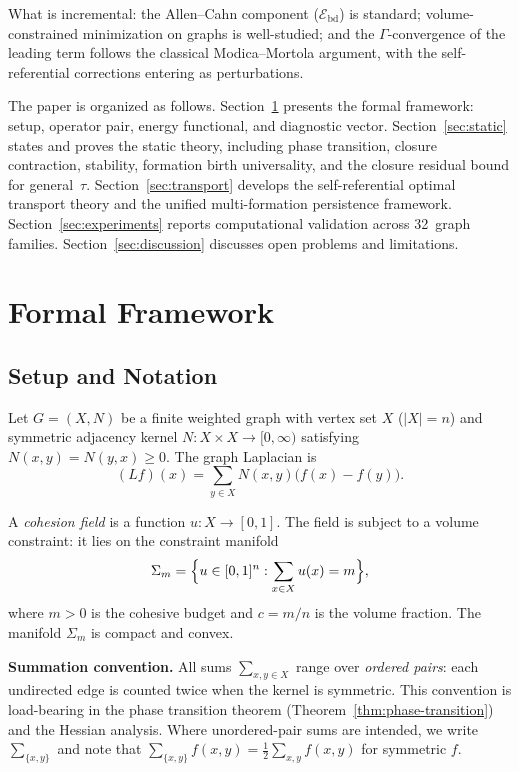 \documentclass[lettersize,journal]{IEEEtran}
\begin{document}
What is incremental: the Allen--Cahn component ($\mathcal{E}_{\mathrm{bd}}$) is standard; volume-constrained minimization on graphs is well-studied; and the $\Gamma$-convergence of the leading term follows the classical Modica--Mortola argument, with the self-referential corrections entering as perturbations.

The paper is organized as follows. Section~\ref{sec:framework} presents the formal framework: setup, operator pair, energy functional, and diagnostic vector. Section~\ref{sec:static} states and proves the static theory, including phase transition, closure contraction, stability, formation birth universality, and the closure residual bound for general~$\tau$. Section~\ref{sec:transport} develops the self-referential optimal transport theory and the unified multi-formation persistence framework. Section~\ref{sec:experiments} reports computational validation across 32~graph families. Section~\ref{sec:discussion} discusses open problems and limitations.

\section{Formal Framework}
\label{sec:framework}

\subsection{Setup and Notation}
\label{sec:setup}

Let $G = (X, N)$ be a finite weighted graph with vertex set $X$ ($|X| = n$) and symmetric adjacency kernel $N : X \times X \to [0,\infty)$ satisfying $N(x,y) = N(y,x) \geq 0$. The graph Laplacian is
\begin{equation}
(Lf)(x) = \sum_{y \in X} N(x,y)\bigl(f(x) - f(y)\bigr).
\end{equation}

A \emph{cohesion field} is a function $u : X \to [0,1]$. The field is subject to a volume constraint: it lies on the constraint manifold
\begin{equation}
\Sigma_m = \Bigl\{u \in [0,1]^n : \sum_{x \in X} u(x) = m\Bigr\},
\end{equation}
where $m > 0$ is the cohesive budget and $c = m/n$ is the volume fraction. The manifold $\Sigma_m$ is compact and convex.

\textbf{Summation convention.} All sums $\sum_{x,y \in X}$ range over \emph{ordered pairs}: each undirected edge is counted twice when the kernel is symmetric. This convention is load-bearing in the phase transition theorem (Theorem~\ref{thm:phase-transition}) and the Hessian analysis. Where unordered-pair sums are intended, we write $\sum_{\{x,y\}}$ and note that $\sum_{\{x,y\}} f(x,y) = \frac{1}{2}\sum_{x,y} f(x,y)$ for symmetric $f$.
\end{document}
